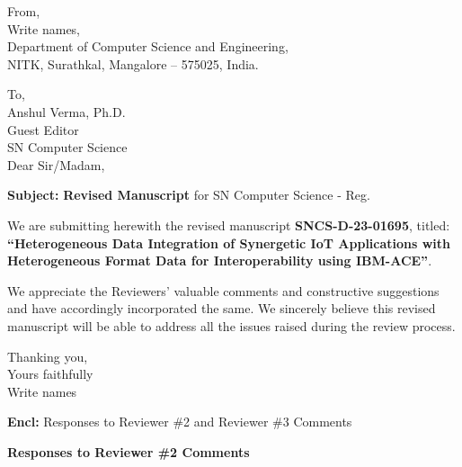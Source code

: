 \documentclass[a4paper,10pt]{article}
\date{}
\begin{document}

	 	 	
\noindent From,\\
Write names,\\
Department of Computer Science and Engineering,\\
NITK, Surathkal, Mangalore – 575025, India.\\

\vspace{0.25in}

\noindent To,\\
Anshul Verma, Ph.D.\\
Guest Editor\\
SN Computer Science\\

\noindent Dear Sir/Madam,

\begin{center}
\textbf{Subject:} \textbf{Revised Manuscript} for SN Computer Science - Reg.
\end{center}

\noindent We are submitting herewith the revised manuscript  \textbf{SNCS-D-23-01695}, titled: \textbf{``Heterogeneous Data Integration of Synergetic IoT Applications with Heterogeneous Format Data for Interoperability using IBM-ACE''}. 

\vspace{0.25in}

\noindent We appreciate the Reviewers’ valuable comments and constructive suggestions and have accordingly incorporated the same. We sincerely believe this revised manuscript will be able to address all the issues raised during the review process.

\vspace{0.25in}

\noindent Thanking you, \\

\noindent Yours faithfully \\ 

\noindent Write names \\

\vspace{0.25in}
 
\noindent \textbf{Encl:} Responses to Reviewer \#2 and Reviewer \#3 Comments


\newpage

\noindent \textbf{Responses to  Reviewer \#2 Comments}
\end{document}
